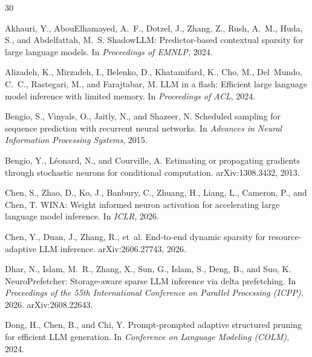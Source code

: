 \documentclass[10pt,twocolumn,letterpaper]{article}
\begin{document}
\small
\setlength{\bibsep}{2pt plus 1pt}
\begin{thebibliography}{30}

Akhauri, Y., AbouElhamayed, A.~F., Dotzel, J., Zhang, Z., Rush, A.~M., Huda, S., and Abdelfattah, M.~S.
\newblock ShadowLLM: Predictor-based contextual sparsity for large language models.
\newblock In \emph{Proceedings of EMNLP}, 2024.

Alizadeh, K., Mirzadeh, I., Belenko, D., Khatamifard, K., Cho, M., Del~Mundo, C.~C., Rastegari, M., and Farajtabar, M.
\newblock LLM in a flash: Efficient large language model inference with limited memory.
\newblock In \emph{Proceedings of ACL}, 2024.

Bengio, S., Vinyals, O., Jaitly, N., and Shazeer, N.
\newblock Scheduled sampling for sequence prediction with recurrent neural networks.
\newblock In \emph{Advances in Neural Information Processing Systems}, 2015.

Bengio, Y., L{\'e}onard, N., and Courville, A.
\newblock Estimating or propagating gradients through stochastic neurons for conditional computation.
\newblock arXiv:1308.3432, 2013.

Chen, S., Zhao, D., Ko, J., Banbury, C., Zhuang, H., Liang, L., Cameron, P., and Chen, T.
\newblock WINA: Weight informed neuron activation for accelerating large language model inference.
\newblock In \emph{ICLR}, 2026.

Chen, Y., Duan, J., Zhang, R., et~al.
\newblock End-to-end dynamic sparsity for resource-adaptive LLM inference.
\newblock arXiv:2606.27743, 2026.

Dhar, N., Islam, M.~R., Zhang, X., Sun, G., Islam, S., Deng, B., and Suo, K.
\newblock NeuroPrefetcher: Storage-aware sparse LLM inference via delta prefetching.
\newblock In \emph{Proceedings of the 55th International Conference on Parallel Processing (ICPP)}, 2026. arXiv:2608.22643.

Dong, H., Chen, B., and Chi, Y.
\newblock Prompt-prompted adaptive structured pruning for efficient LLM generation.
\newblock In \emph{Conference on Language Modeling (COLM)}, 2024.


\end{thebibliography}
\end{document}
